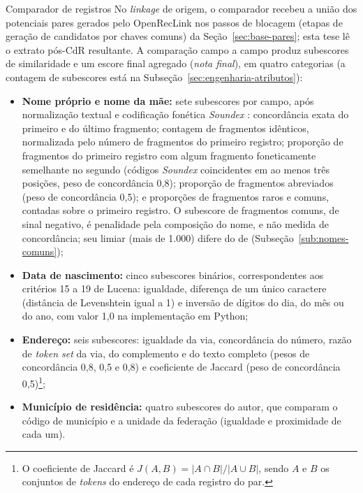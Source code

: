\begin{chapter}{Comparador de registros}
No \textit{linkage} de origem, o comparador recebeu a união dos potenciais pares gerados pelo OpenRecLink nos passos de blocagem (etapas de geração de candidatos por chaves comuns) da Seção~\ref{sec:base-pares}; esta tese lê o extrato pós-CdR resultante. A comparação campo a campo produz subescores de similaridade e um escore final agregado (\textit{nota final}), em quatro categorias (a contagem de subescores está na Subseção~\ref{sec:engenharia-atributos}):

\begin{itemize}
\item \textbf{Nome próprio e nome da mãe:} sete subescores por campo, após normalização textual e codificação fonética \textit{Soundex} \cite{Christen2012book}: concordância exata do primeiro e do último fragmento; contagem de fragmentos idênticos, normalizada pelo número de fragmentos do primeiro registro; proporção de fragmentos do primeiro registro com algum fragmento foneticamente semelhante no segundo (códigos \textit{Soundex} coincidentes em ao menos três posições, peso de concordância 0,8); proporção de fragmentos abreviados (peso de concordância 0,5); e proporções de fragmentos raros e comuns, contadas sobre o primeiro registro. O subescore de fragmentos comuns, de sinal negativo, é penalidade pela composição do nome, e não medida de concordância; seu limiar (mais de 1.000) difere do de  (Subseção~\ref{sub:nomes-comuns});
\item \textbf{Data de nascimento:} cinco subescores binários, correspondentes aos critérios 15 a 19 de Lucena: igualdade, diferença de um único caractere (distância de Levenshtein igual a 1) e inversão de dígitos do dia, do mês ou do ano, com valor 1,0 na implementação em Python;
\item \textbf{Endereço:} seis subescores: igualdade da via, concordância do número, razão de \textit{token set} da via, do complemento e do texto completo (pesos de concordância 0,8, 0,5 e 0,8) e coeficiente de Jaccard (peso de concordância 0,5)\footnote{O coeficiente de Jaccard é $J(A,B) = |A \cap B| / |A \cup B|$, sendo $A$ e $B$ os conjuntos de \textit{tokens} do endereço de cada registro do par.};
\item \textbf{Município de residência:} quatro subescores do autor, que comparam o código de município e a unidade da federação (igualdade e proximidade de cada um).
\end{itemize}


\end{chapter}
